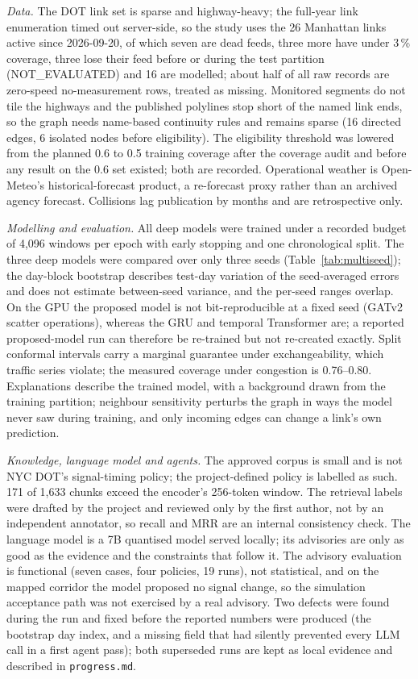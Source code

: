 \label{sec:limitations}
\textit{Data.} The DOT link set is sparse and highway-heavy; the full-year link enumeration timed out server-side, so
the study uses the 26 Manhattan links active since 2026-09-20, of which seven are dead feeds, three more have under
3\,\% coverage, three lose their feed before or during the test partition (NOT\_EVALUATED) and 16 are modelled; about
half of all raw records are zero-speed no-measurement rows, treated as missing. Monitored segments do not tile the
highways and the published polylines stop short of the named link ends, so the graph needs name-based continuity
rules and remains sparse (16 directed edges, 6 isolated nodes before eligibility). The eligibility threshold was
lowered from the planned 0.6 to 0.5 training coverage after the coverage audit and before any result on the 0.6 set
existed; both are recorded. Operational weather is Open-Meteo's historical-forecast product, a re-forecast proxy
rather than an archived agency forecast. Collisions lag publication by months and are retrospective only.

\textit{Modelling and evaluation.} All deep models were trained under a recorded budget of 4{,}096 windows per epoch
with early stopping and one chronological split. The three deep models were compared over only three seeds
(Table~\ref{tab:multiseed}); the day-block bootstrap describes test-day variation of the seed-averaged errors and does
not estimate between-seed variance, and the per-seed ranges overlap. On the GPU the proposed model is not
bit-reproducible at a fixed seed (GATv2 scatter operations), whereas the GRU and temporal Transformer are; a reported
proposed-model run can therefore be re-trained but not re-created exactly. Split conformal intervals carry a marginal guarantee under exchangeability, which traffic series violate; the
measured coverage under congestion is 0.76--0.80. Explanations describe the trained model, with a background drawn
from the training partition; neighbour sensitivity perturbs the graph in ways the model never saw during training,
and only incoming edges can change a link's own prediction.

\textit{Knowledge, language model and agents.} The approved corpus is small and is not NYC DOT's signal-timing
policy; the project-defined policy is labelled as such. 171 of 1{,}633 chunks exceed the encoder's 256-token window.
The retrieval labels were drafted by the project and reviewed only by the first author, not by an independent
annotator, so recall and MRR are an internal consistency check. The language model is a 7B quantised model served locally; its advisories are only as good as the
evidence and the constraints that follow it. The advisory evaluation is functional (seven cases, four policies, 19
runs), not statistical, and on the mapped corridor the model proposed no signal change, so the simulation acceptance
path was not exercised by a real advisory. Two defects were found during the run and fixed before the reported
numbers were produced (the bootstrap day index, and a missing field that had silently prevented every LLM call in a
first agent pass); both superseded runs are kept as local evidence and described in \texttt{progress.md}.

